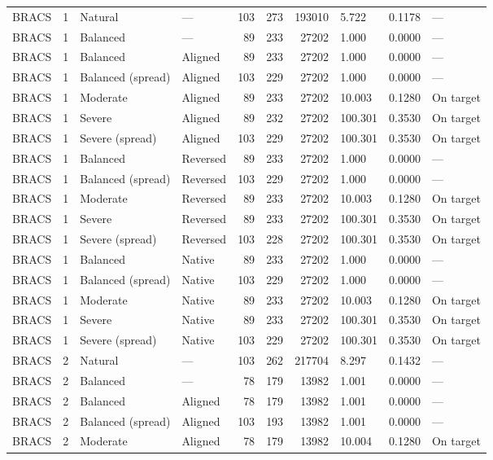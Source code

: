 \begin{longtable}{lrllrrrlll}
BRACS & 1 & Natural & --- & 103 & 273 & 193010 & 5.722 & 0.1178 & --- \\
BRACS & 1 & Balanced & --- & 89 & 233 & 27202 & 1.000 & 0.0000 & --- \\
BRACS & 1 & Balanced & Aligned & 89 & 233 & 27202 & 1.000 & 0.0000 & --- \\
BRACS & 1 & Balanced (spread) & Aligned & 103 & 229 & 27202 & 1.000 & 0.0000 & --- \\
BRACS & 1 & Moderate & Aligned & 89 & 233 & 27202 & 10.003 & 0.1280 & On target \\
BRACS & 1 & Severe & Aligned & 89 & 232 & 27202 & 100.301 & 0.3530 & On target \\
BRACS & 1 & Severe (spread) & Aligned & 103 & 229 & 27202 & 100.301 & 0.3530 & On target \\
BRACS & 1 & Balanced & Reversed & 89 & 233 & 27202 & 1.000 & 0.0000 & --- \\
BRACS & 1 & Balanced (spread) & Reversed & 103 & 229 & 27202 & 1.000 & 0.0000 & --- \\
BRACS & 1 & Moderate & Reversed & 89 & 233 & 27202 & 10.003 & 0.1280 & On target \\
BRACS & 1 & Severe & Reversed & 89 & 233 & 27202 & 100.301 & 0.3530 & On target \\
BRACS & 1 & Severe (spread) & Reversed & 103 & 228 & 27202 & 100.301 & 0.3530 & On target \\
BRACS & 1 & Balanced & Native & 89 & 233 & 27202 & 1.000 & 0.0000 & --- \\
BRACS & 1 & Balanced (spread) & Native & 103 & 229 & 27202 & 1.000 & 0.0000 & --- \\
BRACS & 1 & Moderate & Native & 89 & 233 & 27202 & 10.003 & 0.1280 & On target \\
BRACS & 1 & Severe & Native & 89 & 233 & 27202 & 100.301 & 0.3530 & On target \\
BRACS & 1 & Severe (spread) & Native & 103 & 229 & 27202 & 100.301 & 0.3530 & On target \\
BRACS & 2 & Natural & --- & 103 & 262 & 217704 & 8.297 & 0.1432 & --- \\
BRACS & 2 & Balanced & --- & 78 & 179 & 13982 & 1.001 & 0.0000 & --- \\
BRACS & 2 & Balanced & Aligned & 78 & 179 & 13982 & 1.001 & 0.0000 & --- \\
BRACS & 2 & Balanced (spread) & Aligned & 103 & 193 & 13982 & 1.001 & 0.0000 & --- \\
BRACS & 2 & Moderate & Aligned & 78 & 179 & 13982 & 10.004 & 0.1280 & On target \\

\end{longtable}

